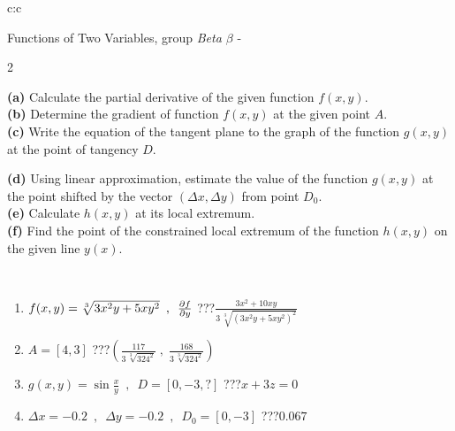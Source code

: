\documentclass[10pt]{report}
\begin{document}
\begin{tabular}{c:c}
\begin{minipage}[c][104.5mm][t]{0.5\linewidth}
\begin{center}
\vspace{7mm}
{\huge \LARGE Functions of Two Variables, group \textit{Beta $\beta$} -}\\[5mm]
\begin{minipage}{0.95\linewidth}
\begin{center}
{\small \begin{multicols}{2} \raggedright
\textbf{(a)} Calculate the partial derivative of the given function \(f(x,y)\). \\[1mm]
\textbf{(b)} Determine the gradient of function \(f(x,y)\) at the given point \(A\). \\[1mm]
\textbf{(c)} Write the equation of the tangent plane to the graph of the function \(g(x,y)\) at the point of tangency \(D\). \par \columnbreak
\textbf{(d)} Using linear approximation, estimate the value of the function \(g(x,y)\) at the point shifted by the vector \((\Delta x, \Delta y)\) from point \(D_0\). \\[1mm]
\textbf{(e)} Calculate \(h(x,y)\) at its local extremum. \\[1mm]
\textbf{(f)} Find the point of the constrained local extremum of the function \(h(x,y)\) on the given line \(y(x)\). \\[1mm]
\end{multicols}
}
\end{center}
\end{minipage}
\\[4mm]
\begin{minipage}{0.79\linewidth}
\begin{center}
\begin{varwidth}{\linewidth}
\begin{enumerate}
\normalsizerr
\item $f(x,y) = \sqrt[3]{3x^2y + 5xy^2}\enspace , \enspace \pdv{f}{y}$\quad \dotfill\; ???\;\dotfill \quad $\frac{3x^2+10xy}{3\,\sqrt[3]{(3x^2y+5xy^2)^{2}}}$
\item $A = [4, 3]$\quad \dotfill\; ???\;\dotfill \quad $\left( \frac{117}{3\,\sqrt[3]{324^2}} \;,\; \frac{168}{3\,\sqrt[3]{324^2}} \right)$
\item $g(x,y) = \sin\frac{x}{y} \enspace , \enspace D = [0, -3, ?]$\quad \dotfill\; ???\;\dotfill \quad $x+3z=0$
\item $\Delta x = {-0.2} \enspace,\enspace \Delta y = {-0.2} \enspace,\enspace D_0 = [0,-3]$\quad \dotfill\; ???\;\dotfill \quad $0.067$

\end{enumerate}
\end{varwidth}
\end{center}
\end{minipage}
\end{center}
\end{minipage}
\end{tabular}
\end{document}
